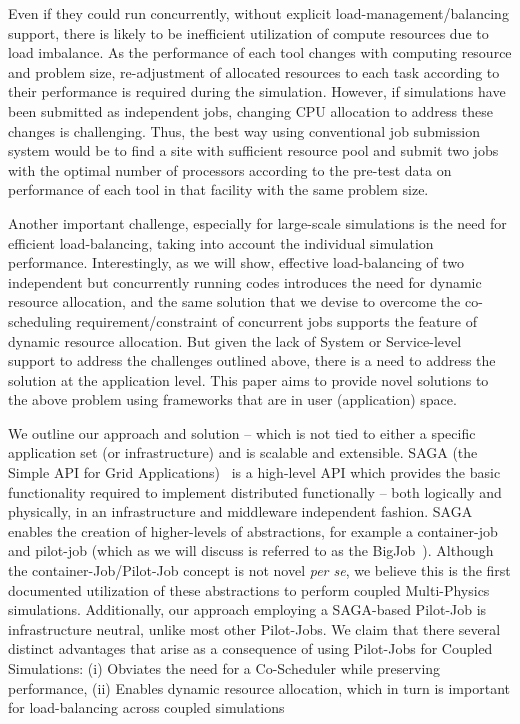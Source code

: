 \documentclass[conference,final]{IEEEtran}
\begin{document}
Even if they could run concurrently, without explicit load-management/balancing support, there is likely to be inefficient utilization of compute resources due to load imbalance.  As the performance of each tool changes with computing resource and problem size, re-adjustment of allocated resources to each task according to their performance is required during the simulation. However, if simulations have been submitted as independent jobs, changing CPU allocation to address these changes is challenging. Thus, the best way using conventional job submission system would be to find a site with sufficient resource pool and submit two jobs with the optimal number of processors according to the pre-test data on performance of each tool in that facility with the same problem size.

Another important challenge, especially for large-scale simulations is the need for efficient load-balancing, taking into account the individual simulation performance.  Interestingly, as we will show, effective load-balancing of two independent but concurrently running codes introduces the need for dynamic resource allocation, and the same solution that we devise to overcome the co-scheduling requirement/constraint of concurrent jobs supports the feature of dynamic resource allocation.  But given the lack of System or Service-level support to address the challenges outlined above, there is a need to address the solution at the application level. This paper aims to provide novel solutions to the above problem using frameworks that are in user (application) space.

We outline our approach and solution -- which is not tied to either a specific application set (or infrastructure) and is scalable and extensible. SAGA (the Simple API for Grid Applications)~\cite{saga_web} is a high-level API which provides the basic functionality required to implement distributed functionally -- both logically and physically, in an infrastructure and middleware independent fashion.  SAGA enables the creation of higher-levels of abstractions, for example a container-job and pilot-job (which as we will discuss is referred to as the BigJob~\cite{saga_royalsoc}). %
Although the container-Job/Pilot-Job concept is not novel {\it per se}, we believe this is the first documented utilization of these abstractions to perform coupled Multi-Physics simulations. Additionally, our approach employing a SAGA-based Pilot-Job is infrastructure neutral, unlike most other Pilot-Jobs.  We claim that there
several distinct advantages that arise as a consequence of using Pilot-Jobs for Coupled Simulations: (i) Obviates the need for a Co-Scheduler while preserving performance, (ii) Enables dynamic resource allocation, which in turn is important for load-balancing across coupled simulations
\end{document}
